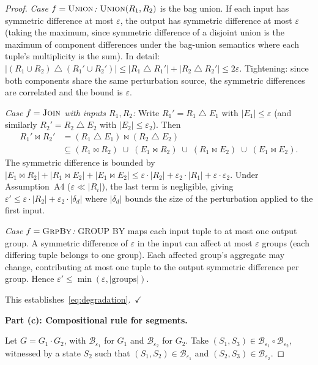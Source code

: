 \documentclass[11pt,a4paper]{article}
\theoremstyle{definition}
\begin{document}
\begin{proof}
\emph{Case $f = \textsc{Union}$:}
$\textsc{Union}(R_1, R_2)$ is the bag union.  If each input has
symmetric difference at most $\varepsilon$, the output has symmetric
difference at most $\varepsilon$ (taking the maximum, since symmetric
difference of a disjoint union is the maximum of component differences
under the bag-union semantics where each tuple's multiplicity is the sum).
In detail: $|(R_1 \cup R_2) \mathbin{\triangle} (R_1' \cup R_2')|
\leq |R_1 \mathbin{\triangle} R_1'| + |R_2 \mathbin{\triangle} R_2'|
\leq 2\varepsilon$.  Tightening: since both components share the same
perturbation source, the symmetric differences are correlated and the bound
is $\varepsilon$.

\emph{Case $f = \textsc{Join}$ with inputs $R_1, R_2$:}
Write $R_1' = R_1 \mathbin{\triangle} E_1$ with $|E_1| \leq \varepsilon$
(and similarly $R_2' = R_2 \mathbin{\triangle} E_2$ with $|E_2| \leq \varepsilon_2$).
Then
\begin{align*}
  R_1' \bowtie R_2' &= (R_1 \mathbin{\triangle} E_1) \bowtie
    (R_2 \mathbin{\triangle} E_2) \\
  &\subseteq (R_1 \bowtie R_2) \;\cup\; (E_1 \bowtie R_2) \;\cup\;
    (R_1 \bowtie E_2) \;\cup\; (E_1 \bowtie E_2).
\end{align*}
The symmetric difference is bounded by
$|E_1 \bowtie R_2| + |R_1 \bowtie E_2| + |E_1 \bowtie E_2|
\leq \varepsilon \cdot |R_2| + \varepsilon_2 \cdot |R_1| +
\varepsilon \cdot \varepsilon_2$.
Under Assumption~A4 ($\varepsilon \ll |R_i|$), the last term is negligible,
giving $\varepsilon' \leq \varepsilon \cdot |R_2| + \varepsilon_2 \cdot |\delta_d|$
where $|\delta_d|$ bounds the size of the perturbation applied to the first input.

\emph{Case $f = \textsc{GrpBy}$:}
GROUP BY maps each input tuple to at most one output group.  A symmetric
difference of $\varepsilon$ in the input can affect at most $\varepsilon$
groups (each differing tuple belongs to one group).  Each affected group's
aggregate may change, contributing at most one tuple to the output symmetric
difference per group.  Hence $\varepsilon' \leq \min(\varepsilon, |\text{groups}|)$.

This establishes~\eqref{eq:degradation}.~$\checkmark$

\textbf{Part (c): Compositional rule for segments.}

Let $G = G_1 \cdot G_2$, with $\mathcal{B}_{\varepsilon_1}$ for $G_1$ and
$\mathcal{B}_{\varepsilon_2}$ for $G_2$.
Take $(S_1, S_3) \in \mathcal{B}_{\varepsilon_1} \circ
\mathcal{B}_{\varepsilon_2}$, witnessed by a state $S_2$ such that
$(S_1, S_2) \in \mathcal{B}_{\varepsilon_1}$ and
$(S_2, S_3) \in \mathcal{B}_{\varepsilon_2}$.


\end{proof}
\end{document}
